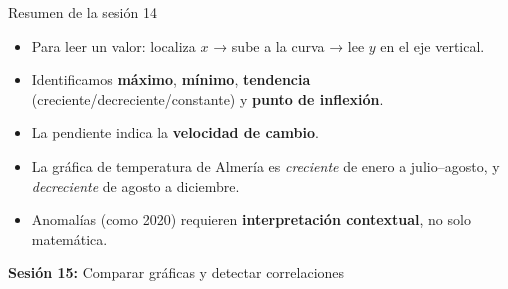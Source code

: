 \documentclass[aspectratio=169, 10pt, spanish]{beamer}
\begin{document}
\begin{frame}{Resumen de la sesión 14}
  \begin{resumenbox}
    \begin{itemize}
      \item Para leer un valor: localiza $x$ → sube a la curva
            → lee $y$ en el eje vertical.
      \item Identificamos \textbf{máximo}, \textbf{mínimo},
            \textbf{tendencia} (creciente/decreciente/constante)
            y \textbf{punto de inflexión}.
      \item La pendiente indica la \textbf{velocidad de cambio}.
      \item La gráfica de temperatura de Almería es \textit{creciente}
            de enero a julio--agosto, y \textit{decreciente} de agosto
            a diciembre.
      \item Anomalías (como 2020) requieren \textbf{interpretación
            contextual}, no solo matemática.
    \end{itemize}
  \end{resumenbox}
  \vspace{6pt}
  \begin{center}
    {\AlmFontSmall\color{AlmAzulM}\faArrowCircleRight\enskip
    \textbf{Sesión 15:} Comparar gráficas y detectar correlaciones}
  \end{center}
\end{frame}
\end{document}

